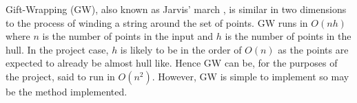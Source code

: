 Gift-Wrapping (GW), also known as Jarvis' march \cite{Jarvis1973}, is similar in two dimensions to the process of winding a string around the set of points. 
GW runs in $O(nh)$  \cite{Cormen2001} where $n$ is the number of points in the input and $h$ is the number of points in the hull. In the project case, $h$ is likely to be in the order of $O(n)$ as the points are expected to already be almost hull like. 
Hence GW can be, for the purposes of the project, said to run in $O(n^2)$. However, GW is simple to implement so may be the method implemented.



